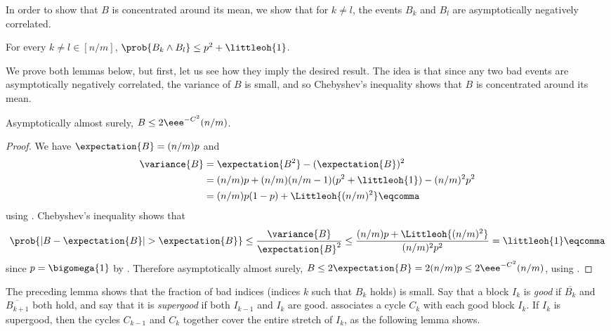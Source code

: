 \documentclass{toc}
\begin{document}
In order to show that $B$ is concentrated around its mean, we show that for $k \neq l$, the events $B_k$ and $B_l$ are asymptotically negatively correlated.

\begin{lemma} \label{lem:correlation}
 For every $k \neq l \in [n/m]$, $\prob{B_k \land B_l} \leq p^2 + \littleoh{1}$.
\end{lemma}

We prove both lemmas below, but first, let us see how they imply the desired result. The idea is that since any two bad events are asymptotically negatively correlated, the variance of $B$ is small, and so Chebyshev's inequality shows that $B$ is concentrated around its mean.

\begin{lemma} \label{lem:concentration}
 Asymptotically almost surely, $B \leq 2\eee^{-C^2} (n/m)$.
\end{lemma}
\begin{proof}
 We have $\expectation{B} = (n/m)p$ and
\begin{align*}
 \variance{B} &= \expectation{B^2} - (\expectation{B})^2 \\ &=
 (n/m)p + (n/m)(n/m-1)(p^2 + \littleoh{1}) - (n/m)^2p^2 \\ &=
 (n/m)p(1-p) + \Littleoh{(n/m)^2} \eqcomma
\end{align*}
 using . Chebyshev's inequality shows that
\begin{equation}
 \prob{|B-\expectation{B}|>\expectation{B}} \leq \frac{\variance{B}}{\expectation{B}^2} \leq \frac{(n/m)p + \Littleoh{(n/m)^2}}{(n/m)^2p^2} = \littleoh{1} \eqcomma
\end{equation}
 since $p = \bigomega{1}$ by .
 Therefore asymptotically almost surely, $B \leq 2\expectation{B} = 2(n/m)p \leq 2\eee^{-C^2} (n/m)$, using .
\end{proof}

The preceding lemma shows that the fraction of bad indices (indices $k$ such that $B_k$ holds) is small. Say that a block $I_k$ is \emph{good} if $\overline{B_k}$ and $\overline{B_{k+1}}$ both hold, and say that it is \emph{supergood} if both $I_{k-1}$ and $I_k$ are good.  associates a cycle $C_k$ with each good block $I_k$. If $I_k$ is supergood, then the cycles $C_{k-1}$ and $C_k$ together cover the entire stretch of $I_k$, as the following lemma shows.
\end{document}
